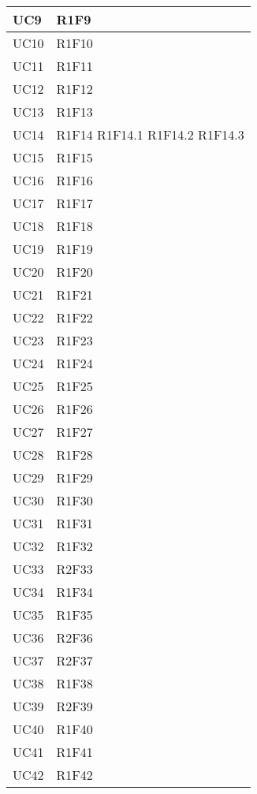 \begin{center}
\begin{longtable}{|p{44mm}|p{22mm}|}
		\hline
		UC9 &
		R1F9 
		\\
		\hline
		UC10 &
		R1F10 
		\\
		\hline
		UC11 &
		R1F11 
		\\
		\hline
		UC12 &
		R1F12 
		\\
		\hline
		UC13 &
		R1F13 
		\\
		\hline
		UC14 &
		R1F14 \newline
		R1F14.1 \newline
		R1F14.2 \newline
		R1F14.3 
		\\
		\hline
		UC15 &
		R1F15 
		\\
		\hline
		UC16 &
		R1F16 
		\\
		\hline
		UC17 &
		R1F17 
		\\
		\hline
		UC18 &
		R1F18 
		\\
		\hline
		UC19 &
		R1F19 
		\\
		\hline
		UC20 &
		R1F20 
		\\
		\hline
		UC21 &
		R1F21 
		\\
		\hline
		UC22 &
		R1F22 
		\\
		\hline
		UC23 &
		R1F23 
		\\
		\hline
		UC24 &
		R1F24 
		\\
		\hline
		UC25 &
		R1F25 
		\\
		\hline
		UC26 &
		R1F26 
		\\
		\hline
		UC27 &
		R1F27 
		\\
		\hline
		UC28 &
		R1F28 
		\\
		\hline
		UC29 &
		R1F29 
		\\
		\hline
		UC30 &
		R1F30 
		\\
		\hline
		UC31 &
		R1F31 
		\\
		\hline
		UC32 &
		R1F32 
		\\
		\hline
		UC33 &
		R2F33 
		\\
		\hline
		UC34 &
		R1F34 
		\\
		\hline
		UC35 &
		R1F35 
		\\
		\hline
		UC36 &
		R2F36 
		\\
		\hline
		UC37 &
		R2F37 
		\\
		\hline
		UC38 &
		R1F38 
		\\
		\hline
		UC39 &
		R2F39 
		\\
		\hline
		UC40 &
		R1F40 
		\\
		\hline
		UC41 &
		R1F41 
		\\
		\hline
		UC42 &
		R1F42 
		\\

\end{longtable}
\end{center}
